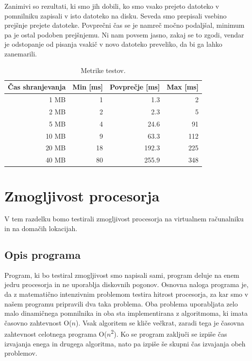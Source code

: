 Zanimivi so rezultati, ki smo jih dobili, ko smo vsako prejeto datoteko v pomnilniku zapisali v isto datoteko na disku. Seveda smo prepisali vsebino prejšnje prejete datoteke. Povprečni čas se je namreč močno podaljšal, minimum pa je ostal podoben prejšnjemu. Ni nam povsem jasno, zakaj se to zgodi, vendar je odstopanje od pisanja vsakič v novo datoteko preveliko, da bi ga lahko zanemarili.

\begin{table}[H]
	\centering
	\begin{tabular}{ | r | r | r | r | }
		\hline
		Čas shranjevanja & Min [ms] & Povprečje [ms] & Max [ms]  \\
		\hline
		1 MB & 1 & 1.3 & 2 \\
		2 MB & 2 & 2.3 & 5 \\
		5 MB & 4 & 24.6 & 91 \\
		10 MB & 9 & 63.3 & 112 \\
		20 MB & 18 & 192.3 & 225 \\
		40 MB & 80 & 255.9 & 348 \\
		\hline
	\end{tabular}
	\caption{Metrike  testov.}
	\label{table:1_chunks}
\end{table}

\section{Zmogljivost procesorja}

V tem razdelku bomo testirali zmogljivost procesorja na virtualnem računalniku in na domačih lokacijah.


\subsection{Opis programa}

Program, ki bo testiral zmogljivost smo napisali sami, program deluje na enem jedru procesorja in ne uporablja diskovnih pogonov.
Osnovna naloga programa je, da z matematično intenzivnim problemom testira hitrost procesorja, za kar smo v našem programu pripravili dva taka problema. Oba problema uporabljata zelo malo dinamičnega pomnilnika in oba sta implementirana z algoritmoma, ki imata časovno zahtevnost O($n$). Vsak algoritem se kliče večkrat, zaradi tega je časovna zahtevnost celotnega programa O($n$\textsuperscript{2}). Ko se program zaključi se izpiše čas izvajanja enega in drugega algoritma, nato pa izpiše še skupni čas izvajanja obeh problemov.



